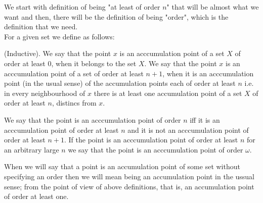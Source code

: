 We start with definition of being "at least of order $n$" that will be almost what we want
and then, there will be the definition of being "order", which is the definition that we need. \\
For a given set we define as follows:
\begin{definition}
(Inductive). 
We say that the point $x$ is an acccumulation point of a set $X$ 
of order at least $0$, when it belongs to the set $X$. 
We say that the point $x$ is an acccumulation point of a set 
of order at least $n + 1$, when it is 
an acccumulation point (in the usual sense) of the accumulation points each of order at least 
$n$ i.e. in every neighbourhood of $x$ there is at least one accumulation point of a set $X$ 
of order at least $n$, distincs from $x$. 
\end{definition}  
\begin{definition}
We say that the point is an acccumulation point of order $n$ iff it is an acccumulation point 
of order at least $n$ and it is not an acccumulation point of order at least $n+1$. 
If the point is an acccumulation point of order at least $n$ for an arbitrary large 
$n$ we say that 
the point is an acccumulation point of order $\omega$.
\end{definition}
When we will say that a point is an accumulation point of some set without specifying an order 
then we will mean being an accumulation point in the ussual sense; from the point of view 
of above definitions, that is, an accumulation point of order at least one.
\begin{lemma}

\end{lemma}

